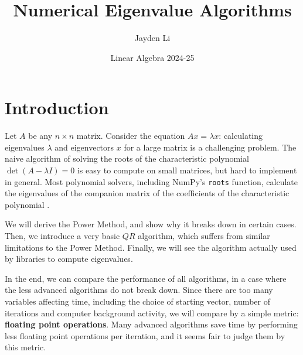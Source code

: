 \documentclass{article}
\title{\vspace*{-40pt}Numerical Eigenvalue Algorithms}
\author{Jayden Li}
\date{Linear Algebra 2024-25}
\begin{document}
\fontsize{11pt}{12pt}\selectfont
\setlength{\abovedisplayskip}{\abovedisplayskip/2}
\setlength{\belowdisplayskip}{\belowdisplayskip/2}
\setlength{\parindent}{0pt}
\setlength{\parskip}{2ex plus 0.5ex minus 0.2ex}
\maketitle

\section{Introduction}

Let $A$ be any $n\times n$ matrix. Consider the equation $Ax=\lambda x$: calculating eigenvalues $\lambda$ and eigenvectors $x$ for a large matrix is a challenging problem. The naive algorithm of solving the roots of the characteristic polynomial $\det(A-\lambda I)=0$ is easy to compute on small matrices, but hard to implement in general. Most polynomial solvers, including NumPy's \texttt{roots} function, calculate the eigenvalues of the companion matrix of the coefficients of the characteristic polynomial \cite{nproots}.

We will derive the Power Method, and show why it breaks down in certain cases. Then, we introduce a very basic $QR$ algorithm, which suffers from similar limitations to the Power Method. Finally, we will see the algorithm actually used by libraries to compute eigenvalues.

In the end, we can compare the performance of all algorithms, in a case where the less advanced algorithms do not break down. Since there are too many variables affecting time, including the choice of starting vector, number of iterations and computer background activity, we will compare by a simple metric: \textbf{floating point operations}. Many advanced algorithms save time by performing less floating point operations per iteration, and it seems fair to judge them by this metric.

\end{document}

